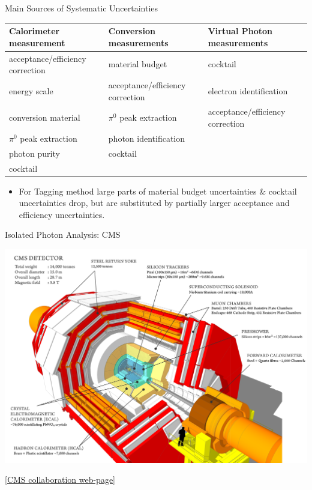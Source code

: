 \documentclass[aspectratio=169,10pt]{beamer}
\begin{document}
  
  \begin{frame}{Main Sources of Systematic Uncertainties}
    \begin{table}
     \begin{tabular}{lll}
      \toprule
      \textbf{Calorimeter measurement}  & \textbf{Conversion measurements} & \textbf{Virtual Photon measurements}\\ \midrule
      acceptance/efficiency correction  & material budget                 & cocktail \\ 
      energy scale                      & acceptance/efficiency correction & electron identification \\
      conversion material               & $\pi^0$ peak extraction         & acceptance/efficiency correction\\  
      $\pi^0$ peak extraction           & photon identification \\
      photon purity                     & cocktail \\
      cocktail                          \\ \bottomrule
     \end{tabular}
    \end{table}
    \begin{itemize}
     \item For Tagging method large parts of material budget uncertainties \& cocktail uncertainties drop, but are substituted by partially larger acceptance and efficiency uncertainties.
    \end{itemize}

  \end{frame}

 
  \begin{frame}{Isolated Photon Analysis: CMS}
    \begin{center}
      \includegraphics[height=0.85\textheight]{EMLectureWeek2018/cms.png}
    \end{center}
    \vspace{-0.5cm}\tiny \href{http://cms.web.cern.ch/news/cms-detector-design}{[CMS collaboration web-page]}
  \end{frame}
\end{document}
